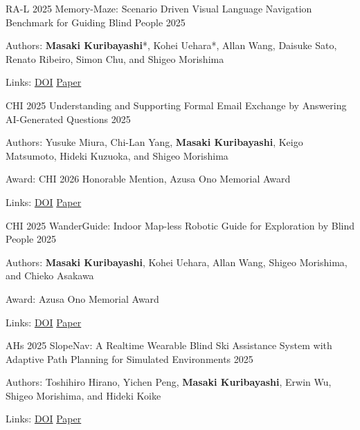 \begin{cventries}
  \cventry
    {RA-L 2025}
    {Memory-Maze: Scenario Driven Visual Language Navigation Benchmark for Guiding Blind People}
    {}
    {2025}
    {
      \begin{cvitems}
        \item {Authors: \textbf{Masaki Kuribayashi}*, Kohei Uehara*, Allan Wang, Daisuke Sato, Renato Ribeiro, Simon Chu, and Shigeo Morishima}
        \item {Links: \href{https://doi.org/10.1109/LRA.2025.3615028}{DOI} \enskip\textbar\enskip \href{https://www.masakikuribayashi.com/data/project/masaki_kuribayashi_ra_l_2025/paper.pdf}{Paper}}
      \end{cvitems}
    }

  \cventry
    {CHI 2025}
    {Understanding and Supporting Formal Email Exchange by Answering AI-Generated Questions}
    {}
    {2025}
    {
      \begin{cvitems}
        \item {Authors: Yusuke Miura, Chi-Lan Yang, \textbf{Masaki Kuribayashi}, Keigo Matsumoto, Hideki Kuzuoka, and Shigeo Morishima}
        \item {Award: CHI 2026 Honorable Mention, Azusa Ono Memorial Award}
        \item {Links: \href{https://doi.org/10.1145/3706598.3714016}{DOI} \enskip\textbar\enskip \href{https://www.masakikuribayashi.com/data/project/yusuke_miura_chi_2025/paper.pdf}{Paper}}
      \end{cvitems}
    }

  \cventry
    {CHI 2025}
    {WanderGuide: Indoor Map-less Robotic Guide for Exploration by Blind People}
    {}
    {2025}
    {
      \begin{cvitems}
        \item {Authors: \textbf{Masaki Kuribayashi}, Kohei Uehara, Allan Wang, Shigeo Morishima, and Chieko Asakawa}
        \item {Award: Azusa Ono Memorial Award}
        \item {Links: \href{https://doi.org/10.1145/3706598.3713788}{DOI} \enskip\textbar\enskip \href{https://www.masakikuribayashi.com/data/project/masaki_kuribayashi_chi_2025/paper.pdf}{Paper}}
      \end{cvitems}
    }

  \cventry
    {AHs 2025}
    {SlopeNav: A Realtime Wearable Blind Ski Assistance System with Adaptive Path Planning for Simulated Environments}
    {}
    {2025}
    {
      \begin{cvitems}
        \item {Authors: Toshihiro Hirano, Yichen Peng, \textbf{Masaki Kuribayashi}, Erwin Wu, Shigeo Morishima, and Hideki Koike}
        \item {Links: \href{https://doi.org/10.1145/3745900.3746082}{DOI} \enskip\textbar\enskip \href{https://www.masakikuribayashi.com/data/project/toshihiro_hirano_ahs_2025/paper.pdf}{Paper}}
      \end{cvitems}
    }


\end{cventries}
